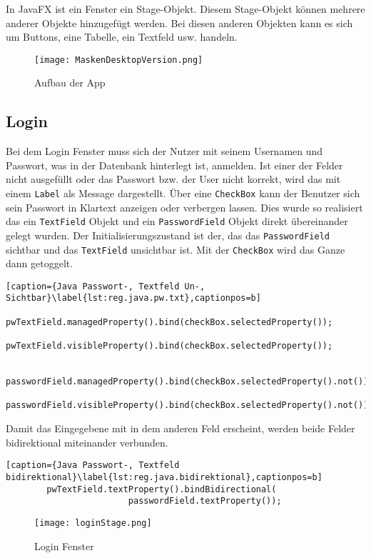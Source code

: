 In JavaFX ist ein Fenster ein Stage-Objekt. Diesem Stage-Objekt können mehrere anderer Objekte hinzugefügt werden. Bei diesen anderen Objekten kann es sich um Buttons, eine Tabelle, ein Textfeld usw. handeln.

\begin{figure}[h]
  \begin{center}
    \texttt{[image: MaskenDesktopVersion.png]}
  		  \caption{Aufbau der App}
     \label{fig.MaskenDesktopVersion}
  \end{center}
\end{figure}\newpage

\subsection{Login}
\label{subsec.login}
Bei dem Login Fenster muss sich der Nutzer mit seinem Usernamen und Passwort, was in der Datenbank hinterlegt ist, anmelden. Ist einer der Felder nicht ausgefüllt oder das Passwort bzw. der User nicht korrekt, wird das mit einem \texttt{Label} als Message dargestellt. Über eine \texttt{CheckBox} kann der Benutzer sich sein Passwort in Klartext anzeigen oder verbergen lassen. Dies wurde so realisiert das ein \texttt{TextField} Objekt und ein \texttt{PasswordField} Objekt direkt übereinander gelegt wurden. Der Initialisierungszustand ist der, das das \texttt{PasswordField} sichtbar und das \texttt{TextField} unsichtbar ist. Mit der \texttt{CheckBox} wird das Ganze dann getoggelt.
\begin{lstlisting}[caption={Java Passwort-, Textfeld Un-, Sichtbar}\label{lst:reg.java.pw.txt},captionpos=b]
		pwTextField.managedProperty().bind(checkBox.selectedProperty());
		pwTextField.visibleProperty().bind(checkBox.selectedProperty());

		passwordField.managedProperty().bind(checkBox.selectedProperty().not());
		passwordField.visibleProperty().bind(checkBox.selectedProperty().not());
\end{lstlisting}
Damit das Eingegebene mit in dem anderen Feld erscheint, werden beide Felder bidirektional miteinander verbunden.
\begin{lstlisting}[caption={Java Passwort-, Textfeld bidirektional}\label{lst:reg.java.bidirektional},captionpos=b]
		pwTextField.textProperty().bindBidirectional(
						passwordField.textProperty());
\end{lstlisting}
\begin{figure}[h]
  \begin{center}
    \texttt{[image: loginStage.png]}
  		  \caption{Login Fenster}
     \label{fig.loginFenster}
  \end{center}
\end{figure}

